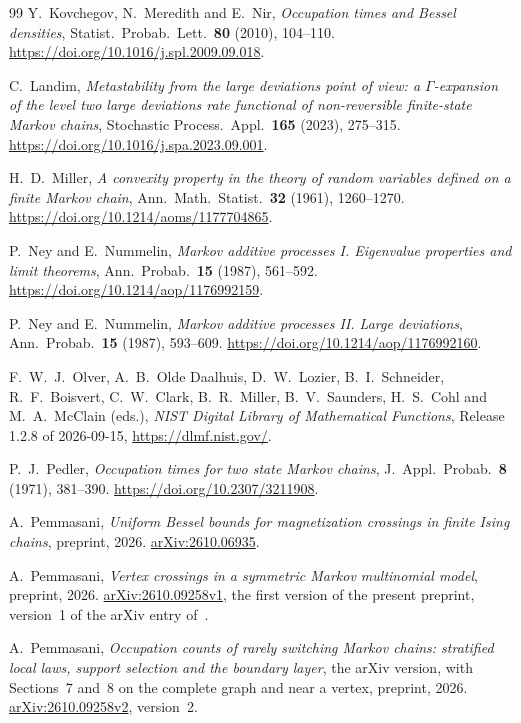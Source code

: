 \begin{thebibliography}{99}
Y.~Kovchegov, N.~Meredith and E.~Nir, \emph{Occupation times and Bessel
densities}, Statist.~Probab.~Lett.~\textbf{80} (2010), 104--110.
\url{https://doi.org/10.1016/j.spl.2009.09.018}.

C.~Landim, \emph{Metastability from the large deviations point of view: a
$\Gamma$-expansion of the level two large deviations rate functional of
non-reversible finite-state Markov chains}, Stochastic Process.~Appl.~\textbf{165}
(2023), 275--315. \url{https://doi.org/10.1016/j.spa.2023.09.001}.

H.~D.~Miller, \emph{A convexity property in the theory of random variables
defined on a finite Markov chain}, Ann.~Math.~Statist.~\textbf{32} (1961),
1260--1270. \url{https://doi.org/10.1214/aoms/1177704865}.

P.~Ney and E.~Nummelin, \emph{Markov additive processes I. Eigenvalue
properties and limit theorems}, Ann.~Probab.~\textbf{15} (1987), 561--592.
\url{https://doi.org/10.1214/aop/1176992159}.

P.~Ney and E.~Nummelin, \emph{Markov additive processes II. Large deviations},
Ann.~Probab.~\textbf{15} (1987), 593--609.
\url{https://doi.org/10.1214/aop/1176992160}.

F.~W.~J.~Olver, A.~B.~Olde Daalhuis, D.~W.~Lozier, B.~I.~Schneider,
R.~F.~Boisvert, C.~W.~Clark, B.~R.~Miller, B.~V.~Saunders, H.~S.~Cohl and
M.~A.~McClain (eds.), \emph{NIST Digital Library of Mathematical Functions},
Release 1.2.8 of 2026-09-15, \url{https://dlmf.nist.gov/}.

P.~J.~Pedler, \emph{Occupation times for two state Markov chains},
J.~Appl.~Probab.~\textbf{8} (1971), 381--390.
\url{https://doi.org/10.2307/3211908}.

A.~Pemmasani, \emph{Uniform Bessel bounds for magnetization crossings in finite
Ising chains}, preprint, 2026.
\href{https://arxiv.org/abs/2610.06935}{arXiv:2610.06935}.

A.~Pemmasani, \emph{Vertex crossings in a symmetric Markov multinomial
model}, preprint, 2026. \href{https://arxiv.org/abs/2610.09258v1}{arXiv:2610.09258v1}\ifarxivbuild, the
first version of the present preprint\else, version~1 of the arXiv entry of~\cite{arxivC1}\fi.

\ifarxivbuild\else
{}
A.~Pemmasani, \emph{Occupation counts of rarely switching Markov chains: stratified local
laws, support selection and the boundary layer}, the arXiv version, with Sections~7 and~8 on the
complete graph and near a vertex, preprint, 2026.
\href{https://arxiv.org/abs/2610.09258v2}{arXiv:2610.09258v2}, version~2.
\fi


\end{thebibliography}
